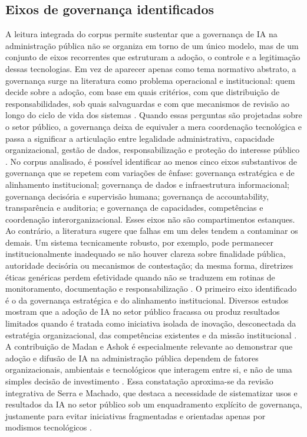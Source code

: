 \documentclass[12pt,a4paper]{article}
\begin{document}
\subsection{Eixos de governança identificados}
\label{sec:org72b98c4}
A leitura integrada do corpus permite sustentar que a governança de IA na administração pública não se organiza em torno de um único modelo, mas de um conjunto de eixos recorrentes que estruturam a adoção, o controle e a legitimação dessas tecnologias. Em vez de aparecer apenas como tema normativo abstrato, a governança surge na literatura como problema operacional e institucional: quem decide sobre a adoção, com base em quais critérios, com que distribuição de responsabilidades, sob quais salvaguardas e com que mecanismos de revisão ao longo do ciclo de vida dos sistemas \autocite{batool2025ai} \autocite{sigfrids2022how}. Quando essas perguntas são projetadas sobre o setor público, a governança deixa de equivaler a mera coordenação tecnológica e passa a significar a articulação entre legalidade administrativa, capacidade organizacional, gestão de dados, responsabilização e proteção do interesse público \autocite{criado2024artificial} \autocite{serra2024a}.
No corpus analisado, é possível identificar ao menos cinco eixos substantivos de governança que se repetem com variações de ênfase: governança estratégica e de alinhamento institucional; governança de dados e infraestrutura informacional; governança decisória e supervisão humana; governança de accountability, transparência e auditoria; e governança de capacidades, competências e coordenação interorganizacional. Esses eixos não são compartimentos estanques. Ao contrário, a literatura sugere que falhas em um deles tendem a contaminar os demais. Um sistema tecnicamente robusto, por exemplo, pode permanecer institucionalmente inadequado se não houver clareza sobre finalidade pública, autoridade decisória ou mecanismos de contestação; da mesma forma, diretrizes éticas genéricas perdem efetividade quando não se traduzem em rotinas de monitoramento, documentação e responsabilização \autocite{goulart2025processos} \autocite{mkander2023auditing}.
O primeiro eixo identificado é o da governança estratégica e do alinhamento institucional. Diversos estudos mostram que a adoção de IA no setor público fracassa ou produz resultados limitados quando é tratada como iniciativa isolada de inovação, desconectada da estratégia organizacional, das competências existentes e da missão institucional \autocite{madan2022ai} \autocite{sharma2021implementing}. A contribuição de Madan e Ashok é especialmente relevante ao demonstrar que adoção e difusão de IA na administração pública dependem de fatores organizacionais, ambientais e tecnológicos que interagem entre si, e não de uma simples decisão de investimento \autocite{madan2022ai}. Essa constatação aproxima-se da revisão integrativa de Serra e Machado, que destaca a necessidade de sistematizar usos e resultados da IA no setor público sob um enquadramento explícito de governança, justamente para evitar iniciativas fragmentadas e orientadas apenas por modismos tecnológicos \autocite{serra2024a}.
\end{document}
